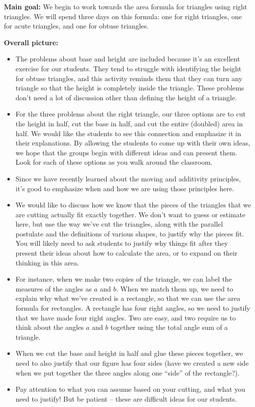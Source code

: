 \documentclass[nooutcomes,noauthor, handout]{ximera}
\begin{document}
\begin{instructorNotes} 

{\bf Main goal:} We begin to work towards the area formula for triangles using right triangles. We will spend three days on this formula: one for right triangles, one for acute triangles, and one for obtuse triangles.

{\bf Overall picture:} 
\begin{itemize}
\item  The problems about base and height are included because it's an excellent exercise for our students. They tend to struggle with identifying the height for obtuse triangles, and this activity reminds them that they can turn any triangle so that the height is completely inside the triangle. These problems don't need a lot of discussion other than defining the height of a triangle.
	\item For the three problems about the right triangle, our three options are to cut the height in half, cut the base in half, and cut the entire (doubled) area in half. We would like the students to see this connection and emphasize it in their explanations. By allowing the students to come up with their own ideas, we hope that the groups begin with different ideas and can present them. Look for each of these options as you walk around the classroom.
	\item Since we have recently learned about the moving and additivity principles, it's good to emphasize when and how we are using those principles here.
	\item We would like to discuss how we know that the pieces of the triangles that we are cutting actually fit exactly together. We don't want to guess or estimate here, but use the way we've cut the triangles, along with the parallel postulate and the definitions of various shapes, to justify why the pieces fit.  You will likely need to ask students to justify why things fit after they present their ideas about how to calculate the area, or to expand on their thinking in this area.
	\item For instance, when we make two copies of the triangle, we can label the measures of the angles as $a$ and $b$. When we match them up, we need to explain why what we've created is a rectangle, so that we can use the area formula for rectangles. A rectangle has four right angles, so we need to justify that we have made four right angles. Two are easy, and two require us to think about the angles $a$ and $b$ together using the total angle sum of a triangle.
	\item When we cut the base and height in half and glue these pieces together, we need to also justify that our figure has four sides (have we created a new side when we put together the three angles along one ``side'' of the rectangle?). 
	\item Pay attention to what you can assume based on your cutting, and what you need to justify! But be patient -- these are difficult ideas for our students.
\end{itemize}



\end{instructorNotes}
\end{document}
